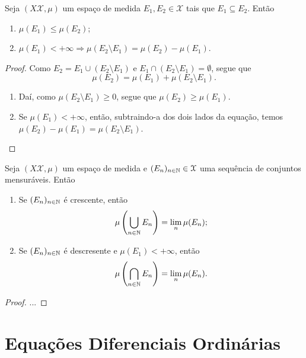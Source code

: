 \begin{prop}
	Seja $(X \mathcal X,\mu)$ um espaço de medida $E_1,E_2 \in \mathcal X$ tais que $E_1 \subseteq E_2$. Então
	\begin{enumerate}
	\item $\mu(E_1) \leq \mu(E_2)$;
	\item $\mu(E_1) < + \infty \Rightarrow \mu(E_2 \setminus E_1) = \mu(E_2) - \mu(E_1)$.
	\end{enumerate}
\end{prop}
\begin{proof}
	Como $E_2 = E_1 \cup (E_2 \setminus E_1)$ e $E_1 \cap (E_2 \setminus E_1) = \emptyset$, segue que
	\begin{equation*}
	\mu(E_2)=\mu(E_1)+\mu(E_2 \setminus E_1).
	\end{equation*}
	\begin{enumerate}
	\item Daí, como $\mu(E_2 \setminus E_1) \geq 0$, segue que $\mu(E_2) \geq \mu(E_1)$.
	\item Se $\mu(E_1) < + \infty$, então, subtraindo-a dos dois lados da equação, temos $\mu(E_2)-\mu(E_1)=\mu(E_2 \setminus E_1)$.
	\end{enumerate}
\end{proof}

\begin{prop}
	Seja $(X \mathcal X,\mu)$ um espaço de medida e $(E_n)_{n \in \mathbb{N}} \in \mathcal X$ uma sequência de conjuntos mensuráveis. Então
	\begin{enumerate}
	\item Se $(E_n)_{n \in \mathbb{N}}$ é crescente, então
		\begin{equation*}
		\mu \left( \bigcup_{n \in \mathbb{N}} E_n \right) = \lim_n \mu(E_n);
		\end{equation*}
	\item Se $(E_n)_{n \in \mathbb{N}}$ é descresente e $\mu(E_1) < + \infty$, então
		\begin{equation*}
		\mu \left( \bigcap_{n \in \mathbb{N}} E_n \right) = \lim_n \mu(E_n).
		\end{equation*}
	\end{enumerate}
\end{prop}
\begin{proof}
	...
\end{proof}




\chapter{Equações Diferenciais Ordinárias}

